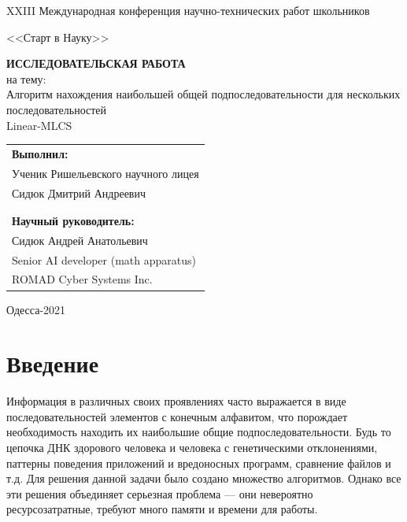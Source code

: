 \documentclass[a4paper,12pt]{extarticle}
\begin{document}
\begin{titlepage}

  \thispagestyle{empty}

  \centerline{\large{XXIII Международная конференция научно-технических работ школьников}}
  \centerline{\large{<<Старт в Науку>>}}

  \vfill

  \begin{center}
    \Huge\textbf{ИССЛЕДОВАТЕЛЬСКАЯ РАБОТА} \\
    \Large{на тему:} \\
    \Large{Алгоритм нахождения наибольшей общей подпоследовательности для нескольких последовательностей\\Linear-MLCS}
  \end{center}

  \begin{flushright}
    \vskip 3in
    \begin{tabular}{l}
      \textbf{Выполнил:}\\Ученик Ришельевского научного лицея\\Сидюк Дмитрий Андреевич\\\\\\
      \textbf{Научный руководитель:}\\Сидюк Андрей Анатольевич\\Senior AI developer (math apparatus)\\ROMAD Cyber Systems Inc.
    \end{tabular}
    \vskip 0.5in
  \end{flushright}

  \centerline{Одесса-2021}

\end{titlepage}

\tableofcontents

\printbibliography[heading=bibintoc]

\thispagestyle{empty}

\setcounter{page}{1}

\clearpage

\section{Введение}

Информация в различных своих проявлениях часто выражается в виде последовательностей элементов с конечным алфавитом, что порождает необходимость находить их наибольшие общие подпоследовательности. Будь то цепочка ДНК здорового человека и человека с генетическими отклонениями, паттерны поведения приложений и вредоносных программ, сравнение файлов и т.д. Для решения данной задачи было создано множество алгоритмов. Однако все эти решения объединяет серьезная проблема — они невероятно ресурсозатратные, требуют много памяти и времени для работы.
\end{document}
